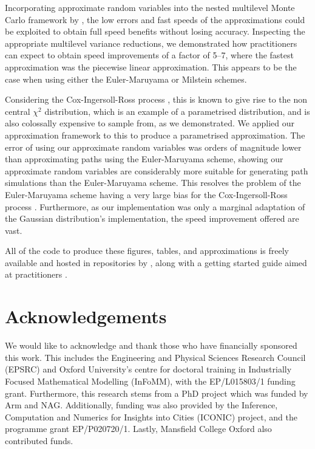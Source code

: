 \documentclass[manuscript,review]{acmart}
\begin{document}
Incorporating approximate random variables into the nested multilevel Monte Carlo framework by \citet{giles2020approximate}, the low errors and fast speeds of the approximations could be exploited to obtain full speed benefits without losing accuracy. Inspecting the appropriate multilevel variance reductions, we demonstrated how practitioners can expect to obtain speed improvements of a factor of 5--7, where the fastest approximation was the piecewise linear approximation. This appears to be the case when using either the Euler-Maruyama or Milstein schemes. 

Considering the Cox-Ingersoll-Ross process \citep{cox1985theory}, this is known to give rise to the non central $ \chi^2 $ distribution, which is an example of a parametrised distribution, and is also colossally expensive to sample from, as we demonstrated. We applied our approximation framework to this to produce a parametrised approximation. The error of using our approximate random variables was orders of magnitude lower than approximating paths using the Euler-Maruyama scheme, showing our approximate random variables are considerably more suitable for generating path simulations than the Euler-Maruyama scheme. This resolves the problem of the Euler-Maruyama scheme having a very large bias for the Cox-Ingersoll-Ross process \citep{broadie2006exact}. Furthermore, as our implementation was only a marginal adaptation of the Gaussian distribution's implementation, the speed improvement offered are vast. 

All of the code to produce these figures, tables, and approximations is freely available and hosted in repositories by \citet{sheridan2020approximate_inverse,sheridan2020approximate_random}, along with a getting started guide aimed at practitioners \citep{sheridan2020approximate_random}.

\section{Acknowledgements}

We would like to acknowledge and thank those who have financially sponsored this work. This includes the Engineering and Physical Sciences Research Council (EPSRC) and Oxford University's centre for doctoral training in Industrially Focused Mathematical Modelling (InFoMM), with the EP/L015803/1 funding grant. Furthermore, this research stems from a PhD project \citep{sheridan2020nested} which was funded by Arm and NAG. Additionally, funding was also provided by the Inference, Computation and Numerics for Insights into Cities (ICONIC) project, and the programme grant EP/P020720/1. Lastly, Mansfield College Oxford also contributed funds.  



\end{document}
